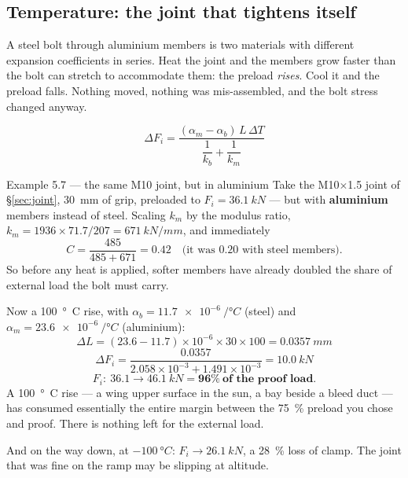 \documentclass[11pt,a4paper]{article}
\begin{document}
\subsection{Temperature: the joint that tightens itself}

A steel bolt through aluminium members is two materials with different expansion coefficients in
series. Heat the joint and the members grow faster than the bolt can stretch to accommodate them:
the preload \emph{rises}. Cool it and the preload falls. Nothing moved, nothing was mis-assembled,
and the bolt stress changed anyway.

\[
\boxed{\;\Delta F_i = \frac{(\alpha_m - \alpha_b)\,L\,\Delta T}{\dfrac{1}{k_b}+\dfrac{1}{k_m}}\;}
\]

\begin{examplebox}{Example 5.7 --- the same M10 joint, but in aluminium}
Take the M10$\times$1.5 joint of \S\ref{sec:joint}, \SI{30}{mm} of grip, preloaded to
$F_i=\SI{36.1}{kN}$ --- but with \textbf{aluminium} members instead of steel. Scaling $k_m$ by the
modulus ratio, $k_m = 1936\times71.7/207 = \SI{671}{kN/mm}$, and immediately
\[
C=\frac{485}{485+671}=\mathbf{0.42}\quad\text{(it was 0.20 with steel members)}.
\]
So before any heat is applied, softer members have already doubled the share of external load the
bolt must carry.

\medskip
Now a \SI{100}{\degree C} rise, with $\alpha_b=\SI{11.7e-6}{/\degree C}$ (steel) and
$\alpha_m=\SI{23.6e-6}{/\degree C}$ (aluminium):
\[
\Delta L = (23.6-11.7)\times10^{-6}\times30\times100 = \SI{0.0357}{mm}
\]
\[
\Delta F_i = \frac{0.0357}{2.058\times10^{-3}+1.491\times10^{-3}} = \SI{10.0}{kN}
\]
\[
F_i: \ 36.1 \longrightarrow \SI{46.1}{kN} = \mathbf{96\%\ \text{of the proof load}}.
\]
A \SI{100}{\degree C} rise --- a wing upper surface in the sun, a bay beside a bleed duct --- has
consumed essentially the entire margin between the \SI{75}{\percent} preload you chose and proof.
There is nothing left for the external load.

\medskip
And on the way down, at $-\SI{100}{\degree C}$: $F_i \to \SI{26.1}{kN}$, a \SI{28}{\percent} loss of
clamp. The joint that was fine on the ramp may be slipping at altitude.
\end{examplebox}
\end{document}

